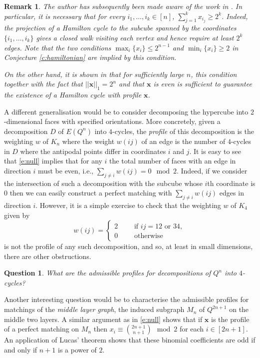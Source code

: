 \documentclass{article}
\newtheorem{remark}[theorem]{Remark}
\newtheorem{question}{Question}
\begin{document}
\begin{remark}
The author has subsequently been made aware of the work in \cite{P21,P12}. In particular, it is necessary that for every $i_1,\ldots, i_k \in [n]$, $\sum_{j=1}^k x_{i_j} \geq 2^k$. Indeed, the projection of a Hamilton cycle to the subcube spanned by the coordinates $\{i_1,\ldots,i_k\}$ gives a closed walk visiting each vertex and hence require at least $2^k$ edges. Note that the two conditions $\max_i \{x_i\} \leq 2^{n-1}$ and $\min_i \{x_i\} \geq 2$ in Conjecture \ref{c:hamiltonian} are implied by this condition.

On the other hand, it is shown in \cite{P21,P12} that for sufficiently large $n$, this condition together with the fact that  $||\bm{x}||_1 = 2^n$ and that $\bm{x}$ is even is sufficient to guarantee the existence of a Hamilton cycle with profile $\bm{x}$.
\end{remark}

A different generalisation would be to consider decomposing the hypercube into $2$-dimensional faces with specified orientations. More concretely, given a decomposition $D$ of $E\left(Q^n\right)$ into $4$-cycles, the \emph{profile} of this decomposition is the weighting $w$ of $K_n$ where the weight $w(ij)$ of an edge is the number of $4$-cycles in $D$ where the antipodal points differ in coordinates $i$ and $j$. It is easy to see that \eqref{e:null} implies that for any $i$ the total number of faces with an edge in direction $i$ must be even, i.e., $\sum_{j \neq i} w(ij) = 0 \mod 2$. Indeed, if we consider the intersection of such a decomposition with the subcube whose $i$th coordinate is $0$ then we can easily construct a perfect matching with $\sum_{j \neq i} w(ij)$ edges in direction $i$. However, it is a simple exercise to check that the weighting $w$ of $K_4$ given by \[
w(ij) = \begin{cases}
    2 \qquad \text{ if } ij= 12 \text{ or } 34,\\
    0 \qquad \text{ otherwise}
    \end{cases}
    \]
is not the profile of any such decomposition, and so, at least in small dimensions, there are other obstructions.
\begin{question}
What are the admissible profiles for decompositions of $Q^n$ into $4$-cycles? 
\end{question}

Another interesting question would be to characterise the admissible profiles for matchings of the \emph{middle layer graph}, the induced subgraph $M_n$ of $Q^{2n+1}$ on the middle two layers. A similar argument as in \eqref{e:null} shows that if $\bm{x}$ is the profile of a perfect matching on $M_n$ then $x_i \equiv \binom{2n+1}{n+1} \mod 2$ for each $i\in [2n+1]$. An application of Lucas' theorem shows that these binomial coefficients are odd if and only if $n+1$ is a power of $2$.
\end{document}
